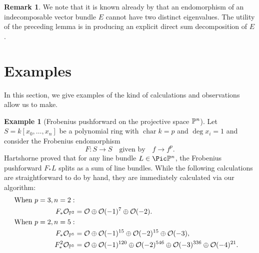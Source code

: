 \documentclass[12pt]{amsart}
\def\OO{\mathcal O}
\theoremstyle{theorem}
\numberwithin{thm}{section}
\theoremstyle{definition}
\newtheorem{exa}[thm]{Example}
\newtheorem{rem}[thm]{Remark}
\begin{document}
\begin{rem}
  We note that it is known already by \cite[Proposition~15]{Atiyah57} that an endomorphism of an indecomposable vector bundle $E$ cannot have two distinct eigenvalues. The utility of the preceding lemma is in producing an explicit direct sum decomposition of $E$.
\end{rem}


\section{Examples}\label{sec:examples}

In this section, we give examples of the kind of calculations and observations  allow us to make.

\begin{exa}[Frobenius pushforward on the projective space $\P^n$]
  Let $S = k[x_0,\dots,x_n]$ be a polynomial ring with $\operatorname{char} k = p$ and $\deg x_i = 1$ and consider the Frobenius endomorphism
  \[ F\colon S\to S \quad \text{given by} \quad f \to f^p. \]
  Hartshorne \cite{Hartshorne1970} proved that for any line bundle $L\in\Pic\P^n$, the Frobenius pushforward $F_*L$ splits as a sum of line bundles. While the following calculations are straightforward to do by hand, they are immediately calculated via our algorithm:
  \begin{align*}
    \text{When }p=3, n=2: \\
    F_*\OO_{\P^2} &= \OO \oplus \OO(-1)^7 \oplus \OO(-2). \\
    \text{When } p=2, n=5: \\
    F_*\OO_{\P^5} &= \OO \oplus \OO(-1)^{15} \oplus \OO(-2)^{15} \oplus \OO(-3), \\
    F_*^2\OO_{\P^5} &= \OO \oplus \OO(-1)^{120} \oplus \OO(-2)^{546} \oplus \OO(-3)^{336} \oplus \OO(-4)^{21}.
  \end{align*}
\end{exa}
\end{document}
